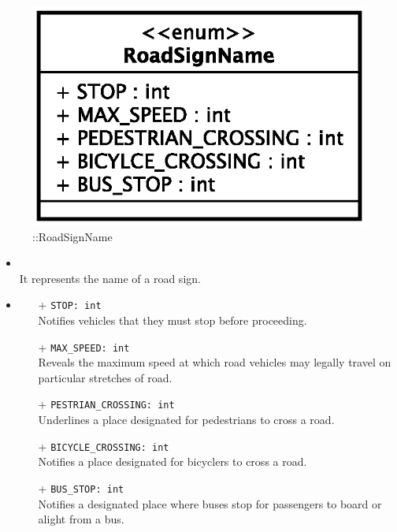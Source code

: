 \begin{figure}[h]
\centering
\includegraphics[scale=0.6,keepaspectratio]{images/solution/app/backend/road_sign_name.eps}
\caption{\pReactiveComponentStretchDecoration::RoadSignName}
\label{fig:sd-app-road-sign-name}
\end{figure}
\FloatBarrier
\begin{itemize}
  \item \textbf{\descr} \\
    It represents the name of a road sign.
  \item \textbf{}
  \begin{itemize}
    \item[+] \texttt{STOP: int} \\
	Notifies vehicles that they must stop before proceeding.
    \item[+] \texttt{MAX\_SPEED: int} \\
    Reveals the maximum speed at which road vehicles may legally travel 
    on particular stretches of road.
    \item[+] \texttt{PESTRIAN\_CROSSING: int} \\
    Underlines a place designated for pedestrians to cross a road.
    \item[+] \texttt{BICYCLE\_CROSSING: int} \\
    Notifies a place designated for bicyclers to cross a road.
    \item[+] \texttt{BUS\_STOP: int} \\
    Notifies a designated place where buses stop for passengers to board 
    or alight from a bus.
  \end{itemize}
\end{itemize}